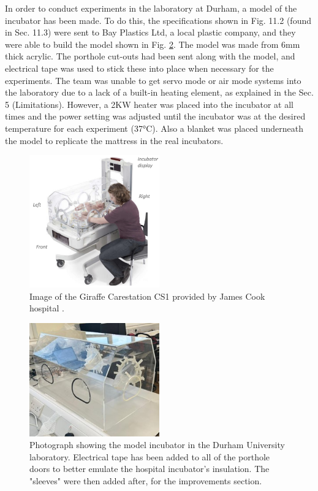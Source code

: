 \documentclass{article}
\begin{document}
 In order to conduct experiments in the laboratory at Durham, a model of the incubator has been made. To do this, the specifications shown in Fig. 11.2 (found in Sec. 11.3) were sent to Bay Plastics Ltd, a local plastic company, and they were able to build the model shown in Fig. \ref{fig:durhamModelPic}. The model was made from 6mm thick acrylic. The porthole cut-outs had been sent along with the model, and electrical tape was used to stick these into place when necessary for the experiments. The team was unable to get servo mode or air mode systems into the laboratory due to a lack of a built-in heating element, as explained in the Sec. 5 (Limitations). However, a 2KW heater was placed into the incubator at all times and the power setting was adjusted until the incubator was at the desired temperature for each experiment (37°C). Also a blanket was placed underneath the model to replicate the mattress in the real incubators. 

\begin{figure}[h]
    \centering
    \captionsetup{justification=centering,margin=1cm}
    \includegraphics[width=0.5\textwidth]{Incubator Image.png}
    \caption{Image of the Giraffe Carestation CS1 provided by James Cook hospital \cite{Longanathan}.}
    \label{Fig 2.1:}
\end{figure}

\vspace{8mm}

\begin{figure}[H]
    \centering
    \includegraphics[width = 0.5\textwidth]{durhamModelPic.jpg}
    \captionsetup{justification=centering,margin=1cm}
    \caption{Photograph showing the model incubator in the Durham University laboratory. Electrical tape has been added to all of the porthole doors to better emulate the hospital incubator's insulation. The "sleeves" were then added after, for the improvements section.}
    \label{fig:durhamModelPic}
\end{figure}
\end{document}

